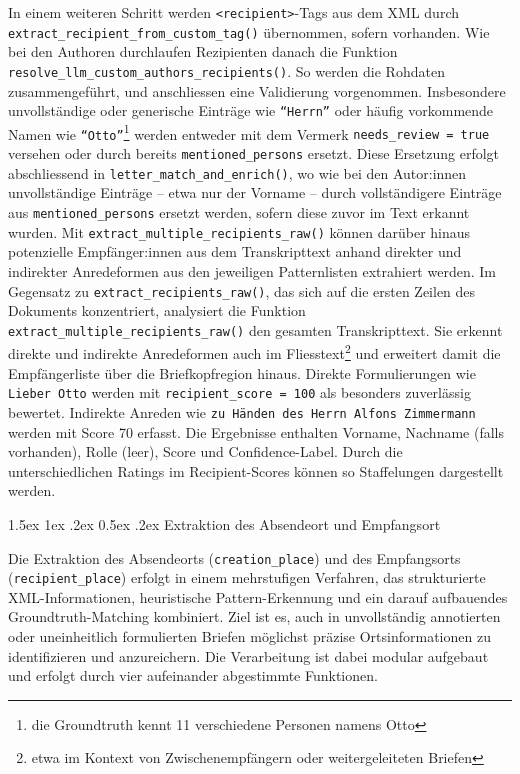 \documentclass[12pt, a4paper, ngerman, bidi=default]{article}
\makeatletter
\newcommand{\code}[1]{\colorbox{VeryLightGray}{\texttt{#1}}} %
\let\oldparagraph\paragraph%
\renewcommand{\paragraph}{
    \@ifstar%
      \xxxParagraphStar%
      \xxxParagraphNoStar%
 }
\newcommand{\xxxParagraphStar}[1]{\oldparagraph*{#1}\mbox{}}
\newcommand{\xxxParagraphNoStar}[1]{\oldparagraph{#1}\mbox{}}
\renewcommand\paragraph{\@startsection{paragraph}{4}{0em}%
  {1.5ex \@plus1ex \@minus.2ex}%
  {0.5ex \@plus.2ex}%
  {\normalfont\normalsize\bfseries\itshape}}
\makeatother
\begin{document}
In einem weiteren Schritt werden \code{<recipient>}-Tags aus dem XML durch \code{extract\_recipient\_from\_custom\_tag()} übernommen, sofern vorhanden. Wie bei den Authoren durchlaufen Rezipienten danach die Funktion \code{resolve\_llm\_custom\_authors\_recipients()}. So werden die Rohdaten zusammengeführt, und anschliessen eine Validierung vorgenommen. Insbesondere unvollständige oder generische Einträge wie \texttt{\enquote{Herrn}} oder häufig vorkommende Namen wie \texttt{\enquote{Otto}}\footnote{die Groundtruth kennt 11 verschiedene Personen namens Otto} werden entweder mit dem Vermerk \code{needs\_review = true} versehen oder durch bereits \code{mentioned\_persons} ersetzt. Diese Ersetzung erfolgt abschliessend in \code{letter\_match\_and\_enrich()}, wo wie bei den Autor:innen unvollständige Einträge – etwa nur der Vorname – durch vollständigere Einträge aus \code{mentioned\_persons} ersetzt werden, sofern diese zuvor im Text erkannt wurden. Mit \code{extract\_multiple\_recipients\_raw()} können darüber hinaus potenzielle Empfänger:innen aus dem Transkripttext anhand direkter und indirekter Anredeformen aus den jeweiligen Patternlisten extrahiert werden. Im Gegensatz zu \code{extract\_recipients\_raw()}, das sich auf die ersten Zeilen des Dokuments konzentriert, analysiert die Funktion \code{extract\_multiple\_recipients\_raw()} den gesamten Transkripttext. Sie erkennt direkte und indirekte Anredeformen auch im Fliesstext\footnote{etwa im Kontext von Zwischenempfängern oder weitergeleiteten Briefen} und erweitert damit die Empfängerliste über die Briefkopfregion hinaus. Direkte Formulierungen wie \texttt{Lieber Otto} werden mit \code{recipient\_score = 100} als besonders zuverlässig bewertet. Indirekte Anreden wie \texttt{zu Händen des Herrn Alfons Zimmermann} werden mit Score 70 erfasst. Die Ergebnisse enthalten Vorname, Nachname (falls vorhanden), Rolle (leer), Score und Confidence-Label. Durch die unterschiedlichen Ratings im Recipient-Scores können so Staffelungen dargestellt werden.


\paragraph{Extraktion des Absendeort und Empfangsort}

Die Extraktion des Absendeorts (\code{creation\_place}) und des Empfangsorts (\code{recipient\_place}) erfolgt in einem mehrstufigen Verfahren, das strukturierte XML-Informationen, heuristische Pattern-Erkennung und ein darauf aufbauendes Groundtruth-Matching kombiniert. Ziel ist es, auch in unvollständig annotierten oder uneinheitlich formulierten Briefen möglichst präzise Ortsinformationen zu identifizieren und anzureichern. Die Verarbeitung ist dabei modular aufgebaut und erfolgt durch vier aufeinander abgestimmte Funktionen.
\end{document}
